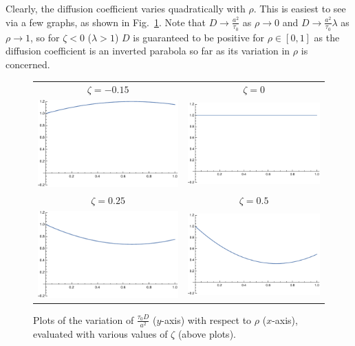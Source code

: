 Clearly, the diffusion coefficient varies quadratically with $\rho$. This is easiest to see via a few graphs, as shown in Fig.~\ref{fig:analDiffCoeffs}. Note that $D \rightarrow \frac{a^2}{\tau_0}$ as $\rho \rightarrow 0$
and $D \rightarrow \frac{a^2}{\tau_0} \lambda$ as $\rho \rightarrow 1$, so for $\zeta < 0$ ($\lambda>1$) $D$ is guaranteed to be positive for $\rho \in [0, 1]$ as the diffusion coefficient is an inverted parabola so far as its
variation in $\rho$ is concerned.
\begin{figure}[h!]
\caption{\label{fig:analDiffCoeffs} Plots of the variation of $\frac{\tau_0 D}{a^2}$ ($y$-axis) with respect to $\rho$ ($x$-axis), evaluated with various values of $\zeta$ (above plots).}
\begin{center}
 \begin{tabular}{c c}
     $\zeta = -0.15$ & $\zeta = 0$ \\ 
     \includegraphics[width=0.49\linewidth]{analytics/images/diffCoeffs/diffCoeff-neg0-15}  & \includegraphics[width=0.49 \linewidth]{analytics/images/diffCoeffs/diffCoeff-0-0} \\
     $\zeta = 0.25$  & $\zeta = 0.5$ \\
     \includegraphics[width=0.49\linewidth]{analytics/images/diffCoeffs/diffCoeff-0-25}  & \includegraphics[width=0.49 \linewidth]{analytics/images/diffCoeffs/diffCoeff-0-5} \\

\end{tabular}
\end{center}
\end{figure}
